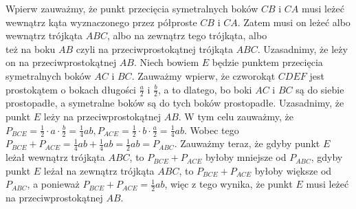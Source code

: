 \documentclass[10pt]{article}
\begin{document}
Wpierw zauważmy, że punkt przecięcia symetralnych boków \(C B\) i \(C A\) musi leżeć wewnątrz kąta wyznaczonego przez półproste \(C B\) i \(C A\). Zatem musi on leżeć albo wewnątrz trójkąta \(A B C\), albo na zewnątrz tego trójkąta, albo\\
też na boku \(A B\) czyli na przeciwprostokątnej trójkąta \(A B C\). Uzasadnimy, że leży on na przeciwprostokątnej \(A B\). Niech bowiem \(E\) będzie punktem przecięcia symetralnych boków \(A C\) i \(B C\). Zauważmy wpierw, że czworokąt \(C D E F\) jest prostokątem o bokach długości \(\frac{a}{2}\) i \(\frac{b}{2}\), a to dlatego, bo boki \(A C\) i \(B C\) są do siebie prostopadłe, a symetralne boków są do tych boków prostopadłe. Uzasadnimy, że punkt \(E\) leży na przeciwprostokątnej \(A B\). W tym celu zauważmy, że \(P_{B C E}=\frac{1}{2} \cdot a \cdot \frac{b}{2}=\frac{1}{4} a b, P_{A C E}=\frac{1}{2} \cdot b \cdot \frac{a}{2}=\frac{1}{4} a b\). Wobec tego \(P_{B C E}+P_{A C E}=\frac{1}{4} a b+\frac{1}{4} a b=\frac{1}{2} a b=P_{A B C}\). Zauważmy teraz, że gdyby punkt \(E\) leżał wewnątrz trójkąta \(A B C\), to \(P_{B C E}+P_{A C E}\) byłoby mniejsze od \(P_{A B C}\), gdyby punkt \(E\) leżał na zewnątrz trójkąta \(A B C\), to \(P_{B C E}+P_{A C E}\) byłoby większe od \(P_{A B C}\), a ponieważ \(P_{B C E}+P_{A C E}=\frac{1}{2} a b\), więc z tego wynika, że punkt \(E\) musi leżeć na przeciwprostokątnej \(A B\).
\end{document}
